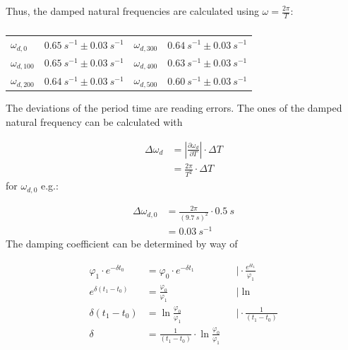             Thus, the damped natural frequencies are calculated using $ \omega=\frac{2\pi}{T} $:\par
            \begin{table}[h]
                \centering
                \caption[Damped natural frequencies]{}
                \begin{tabular}{@{}llll@{}}
                    \toprule
                    $\omega_{d,0}$      &$\SI{0.65}{s^{-1}} \pm \SI{0.03}{s^{-1}}$  &\hspace{10mm}$\omega_{d,300}$  &$\SI{0.64}{s^{-1}} \pm \SI{0.03}{s^{-1}}$\\
                    $\omega_{d,100}$    &$\SI{0.65}{s^{-1}} \pm \SI{0.03}{s^{-1}}$  &\hspace{10mm}$\omega_{d,400}$  &$\SI{0.63}{s^{-1}} \pm \SI{0.03}{s^{-1}}$\\
                    $\omega_{d,200}$    &$\SI{0.64}{s^{-1}} \pm \SI{0.03}{s^{-1}}$  &\hspace{10mm}$\omega_{d,500}$  &$\SI{0.60}{s^{-1}} \pm \SI{0.03}{s^{-1}}$\\
                    \bottomrule
                \end{tabular}
                \label{tab:damped_natural_frequencies}
            \end{table}
            The deviations of the period time are reading errors. The ones of the damped natural frequency can be calculated with\par
            \begin{align}
                \Delta \omega_d &=\left|\frac{\partial \omega_d}{\partial T}\right| \cdot \Delta T \nonumber \\
                                &=\frac{2\pi}{T^2}\cdot \Delta T
            \end{align}
            for $ \omega_{d,0} $ e.g.:\par
            \begin{align}
                \Delta\omega_{d,0}  &=\frac{2\pi}{(\SI{9.7}{s})^2}\cdot \SI{0.5}{s} \nonumber \\
                                    &=\SI{0.03}{s^{-1}}
            \end{align}
            The damping coefficient can be determined by way of\par
            \begin{align}
                \varphi_1 \cdot e^{-\delta t_0} &=\varphi_0 \cdot e^{-\delta t_1}   &&\Bigg|\cdot \frac{e^{\delta t_1}}{\varphi_1} \nonumber\\
                e^{\delta(t_1-t_0)}             &=\frac{\varphi_0}{\varphi_1}       &&\Bigg|\ln \nonumber\\
                \delta(t_1-t_0)                 &=\ln{\frac{\varphi_0}{\varphi_1}}  &&\Bigg|\cdot \frac{1}{(t_1-t_0)} \nonumber\\
                \delta                          &=\frac{1}{(t_1-t_0)}\cdot\ln{\frac{\varphi_0}{\varphi_1}}
            \end{align}
